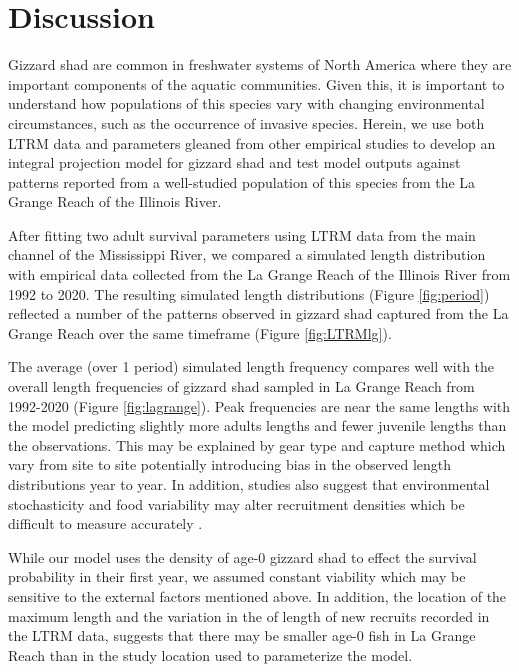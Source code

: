\documentclass[preprint,review,12pt,authoryear]{elsarticle}
\begin{document}
\section{Discussion}
Gizzard shad are common in freshwater systems of North America where they are important components of the aquatic communities. 
Given this, it is important to understand how populations of this species vary with changing environmental circumstances, such as the occurrence of invasive species. 
Herein, we use both LTRM data and parameters gleaned from other empirical studies to develop an integral projection model for gizzard shad and test model outputs against patterns reported from a well-studied population of this species from the La Grange Reach of the Illinois River.   

After fitting two adult survival parameters using LTRM data from the main channel of the Mississippi River, we compared a simulated length distribution with empirical data collected from the La Grange Reach of the Illinois River from 1992 to 2020. 
The resulting simulated length distributions (Figure \ref{fig:period}) reflected a number of the patterns observed in gizzard shad captured from the La Grange Reach over the same timeframe (Figure \ref{fig:LTRMlg}). 

The average (over 1 period) simulated length frequency compares well with the overall length frequencies of  gizzard shad sampled in La Grange Reach from 1992-2020 (Figure \ref{fig:lagrange}). 
Peak frequencies are near the same lengths with the model predicting slightly more adults lengths and fewer juvenile lengths than the observations. 
This may be explained by gear type and capture method which vary from site to site potentially introducing bias in the observed length distributions year to year.
In addition, studies also suggest that environmental stochasticity and food variability may alter recruitment densities which be difficult to measure accurately \citep{rose2000quantitative, okamoto2016stochastic}. 

While our model uses the density of age-0 gizzard shad to effect the survival probability in their first year, we assumed constant viability which may be sensitive to the external factors mentioned above.
In addition, the location of the maximum length and the variation in the of length of new recruits recorded in the LTRM data, suggests that there may be smaller age-0 fish in La Grange Reach than in the study location \citep{michaletz2017variation} used to parameterize the model.  
\end{document}
